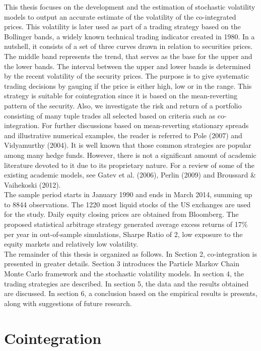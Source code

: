 \documentclass[11pt,a4,twosided,singlespacing,titlepagenumber=on]{scrreprt}
\numberwithin{equation}{chapter} %
\theoremstyle{remark}
\begin{document}
\noindent
This thesis focuses on the development and the estimation of stochastic volatility models to output an accurate estimate of the volatility of the co-integrated prices. This volatility is later used as part of a trading strategy based on the Bollinger bands, a widely known technical trading indicator created in 1980. In a nutshell, it consists of a set of three curves drawn in relation to securities prices. The middle band represents the trend, that serves as the base for the upper and the lower bands. The interval between the upper and lower bands is determined by the recent volatility of the security prices. The purpose is to give systematic trading decisions by gauging if the price is either high, low or in the range. This strategy is suitable for cointegration since it is based on the mean-reverting pattern of the security. Also, we investigate the risk and return of a portfolio consisting of many tuple trades all selected based on criteria such as co-integration. For further discussions based on mean-reverting stationary spreads and illustrative numerical examples, the reader is referred to Pole (2007) and Vidyamurthy (2004).  It is well known that those common strategies are popular among many hedge funds. However, there is not a significant amount of academic literature devoted to it due to its proprietary nature. For a review of some of the existing academic models, see Gatev et al. (2006), Perlin (2009) and Broussard \& Vaihekoski (2012). \\

\noindent
The sample period starts in January 1990 and ends in March 2014, summing up to 8844 observations. The 1220 most liquid stocks of the US exchanges are used for the study. Daily equity closing prices are obtained from Bloomberg. The proposed statistical arbitrage strategy generated average excess returns of 17\% per year in out-of-sample simulations, Sharpe Ratio of 2, low exposure to the equity markets and relatively low volatility. \\

\noindent
The remainder of this thesis is organized as follows. In Section 2, co-integration is presented in greater details. Section 3 introduces the Particle Markov Chain Monte Carlo framework and the stochastic volatility models. In section 4, the trading strategies are described. In section 5, the data and the results obtained are discussed. In section 6, a conclusion based on the empirical results is presents, along with suggestions of future research.

\chapter{Cointegration}
\end{document}
